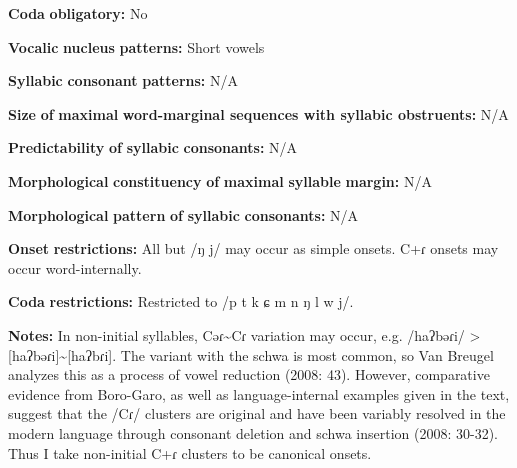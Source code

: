 \begin{styleBody}
\textbf{Coda} \textbf{obligatory:} No
\end{styleBody}

\begin{styleBody}
\textbf{Vocalic} \textbf{nucleus} \textbf{patterns:} Short vowels
\end{styleBody}

\begin{styleBody}
\textbf{Syllabic} \textbf{consonant} \textbf{patterns:} N/A
\end{styleBody}

\begin{styleBody}
\textbf{Size} \textbf{of} \textbf{maximal} \textbf{word{}-marginal sequences with syllabic obstruents:} N/A
\end{styleBody}

\begin{styleBody}
\textbf{Predictability} \textbf{of} \textbf{syllabic} \textbf{consonants:} N/A
\end{styleBody}

\begin{styleBody}
\textbf{Morphological} \textbf{constituency} \textbf{of} \textbf{maximal} \textbf{syllable} \textbf{margin:} N/A
\end{styleBody}

\begin{styleBody}
\textbf{Morphological} \textbf{pattern} \textbf{of} \textbf{syllabic} \textbf{consonants:} N/A
\end{styleBody}

\begin{styleBody}
\textbf{Onset} \textbf{restrictions:} All but /ŋ j/ may occur as simple onsets. C+ɾ onsets may occur word-internally.
\end{styleBody}

\begin{styleBody}
\textbf{Coda} \textbf{restrictions:} Restricted to /p t k ɕ m n ŋ l w j/. 
\end{styleBody}

\begin{styleBody}
\textbf{Notes:} In non-initial syllables, Cəɾ{\textasciitilde}Cɾ variation may occur, e.g. /haʔbəɾi/ > [haʔbəɾi]{\textasciitilde}[haʔbɾi]. The variant with the schwa is most common, so Van Breugel analyzes this as a process of vowel reduction (2008: 43). However, comparative evidence from Boro-Garo, as well as language-internal examples given in the text, suggest that the /Cɾ/ clusters are original and have been variably resolved in the modern language through consonant deletion and schwa insertion (2008: 30-32). Thus I take non-initial C+ɾ clusters to be canonical onsets.
\end{styleBody}

